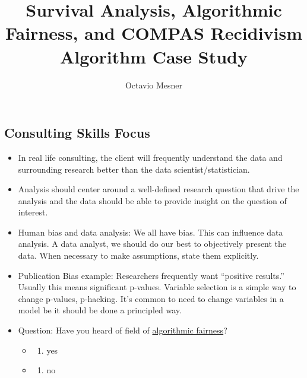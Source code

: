 \documentclass[
]{article}
\title{Survival Analysis, Algorithmic Fairness, and COMPAS Recidivism
Algorithm Case Study}
\author{Octavio Mesner}
\date{}
\providecommand{\tightlist}{%
  \setlength{\itemsep}{0pt}\setlength{\parskip}{0pt}}
\begin{document}
\maketitle

\hypertarget{consulting-skills-focus}{%
\subsection{Consulting Skills Focus}\label{consulting-skills-focus}}

\begin{itemize}
\item
  In real life consulting, the client will frequently understand the
  data and surrounding research better than the data
  scientist/statistician.
\item
  Analysis should center around a well-defined research question that
  drive the analysis and the data should be able to provide insight on
  the question of interest.
\item
  Human bias and data analysis: We all have bias. This can influence
  data analysis. A data analyst, we should do our best to objectively
  present the data. When necessary to make assumptions, state them
  explicitly.\\
\item
  Publication Bias example: Researchers frequently want ``positive
  results.'' Usually this means significant p-values. Variable selection
  is a simple way to change p-values, p-hacking. It's common to need to
  change variables in a model be it should be done a principled way.
\item
  Question: Have you heard of field of
  \href{https://en.wikipedia.org/wiki/Fairness_(machine_learning)}{algorithmic
  fairness}?

  \begin{itemize}
  \item
    \begin{enumerate}
    \def\labelenumi{\alph{enumi})}
    \tightlist
    \item
      yes
    \end{enumerate}
  \item
    \begin{enumerate}
    \def\labelenumi{\alph{enumi})}
    \setcounter{enumi}{1}
    \tightlist
    \item
      no
    \end{enumerate}
  \end{itemize}
\end{itemize}
\end{document}
